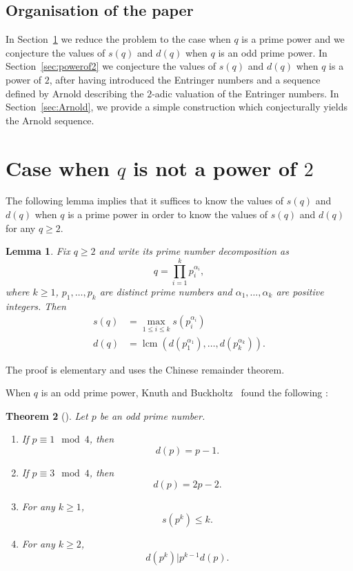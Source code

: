 \documentclass[12pt]{amsart}
\DeclareMathOperator{\lcm}{lcm}
\newtheorem{thm}{Theorem}
\newtheorem{lem}[thm]{Lemma}
\begin{document}
\subsection*{Organisation of the paper}
In Section~\ref{sec:oddprime} we reduce the problem to the case when $q$ is a prime power and we conjecture the values of $s(q)$ and $d(q)$ when $q$ is an odd prime power. In Section~\ref{sec:powerof2} we conjecture the values of $s(q)$ and $d(q)$ when $q$ is a power of $2$, after having introduced the Entringer numbers and a sequence defined by Arnold describing the $2$-adic valuation of the Entringer numbers. In Section~\ref{sec:Arnold}, we provide a simple construction which conjecturally yields the Arnold sequence.



\section{Case when $q$ is not a power of $2$}
\label{sec:oddprime}

The following lemma implies that it suffices to know the values of $s(q)$ and $d(q)$ when $q$ is a prime power in order to know the values of $s(q)$ and $d(q)$ for any $q \geq 2$.

\begin{lem}
Fix $q \geq 2$ and write its prime number decomposition as
\begin{equation}
q=\prod_{i=1}^k p_i^{\alpha_i},
\end{equation}
where $k\geq1$, $p_1,\ldots,p_k$ are distinct prime numbers and $\alpha_1,\ldots,\alpha_k$ are positive integers.
Then
\begin{align}
s(q)&=\max_{1 \leq i \leq k} s(p_i^{\alpha_i}) \\
d(q)&=\lcm (d(p_1^{\alpha_1}),\ldots,d(p_k^{\alpha_k})).
\end{align}
\end{lem}

The proof is elementary and uses the Chinese remainder theorem.

When $q$ is an odd prime power, Knuth and Buckholtz~\cite{KB67} found the following :

\begin{thm}[\cite{KB67}]
\label{thm:KB}
Let $p$ be an odd prime number.
\begin{enumerate}
 \item If $p \equiv 1 \mod 4$, then
 \begin{equation*}
 d(p)=p-1.
 \end{equation*} 
 \item If $p \equiv 3 \mod 4$, then
 \begin{equation*}
 d(p)=2p-2.
 \end{equation*}
 \item For any $k\geq1$,
 \begin{equation*}
 s(p^k)\leq k.
 \end{equation*}
 \item For any $k\geq 2$,
 \begin{equation*}
 d(p^k) | p^{k-1} d(p).
 \end{equation*}
\end{enumerate}
\end{thm}
\end{document}
